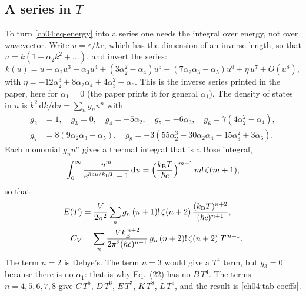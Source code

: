 \subsection{A series in \texorpdfstring{$T$}{T}}
To turn \eqref{ch04:eq-energy} into a series one needs the integral over energy, not over wavevector.
Write $u=\varepsilon/\hbar c$, which has the dimension of an inverse length, so that $u=k(1+\alpha_2k^2+\dots)$, and invert the series:
\begin{equation}\label{ch04:eq-inverse}
 k(u)=u-\alpha_2u^3-\alpha_3u^4+(3\alpha_2^2-\alpha_4)u^5+(7\alpha_2\alpha_3-\alpha_5)u^6+\eta\,u^7+O(u^8),
\end{equation}
with $\eta=-12\alpha_2^3+8\alpha_2\alpha_4+4\alpha_3^2-\alpha_6$.
This is the inverse series printed in the paper, here for $\alpha_1=0$ (the paper prints it for general $\alpha_1$).
The density of states in $u$ is $k^2\,\mathrm dk/\mathrm du=\sum_n g_n u^n$ with
\begin{equation}\label{ch04:eq-dos}
\begin{aligned}
 g_2&=1,\quad g_3=0,\quad g_4=-5\alpha_2,\quad g_5=-6\alpha_3,\quad g_6=7(4\alpha_2^2-\alpha_4),\\
 g_7&=8(9\alpha_2\alpha_3-\alpha_5),\quad g_8=-3(55\alpha_2^3-30\alpha_2\alpha_4-15\alpha_3^2+3\alpha_6).
\end{aligned}
\end{equation}
Each monomial $g_nu^n$ gives a thermal integral that is a Bose integral,
\begin{equation}\label{ch04:eq-bose}
 \int_0^\infty\frac{u^{m}}{e^{\hbar cu/k_{\mathrm B} T}-1}\,\mathrm du=\Bigl(\frac{k_{\mathrm B} T}{\hbar c}\Bigr)^{m+1}\,m!\,\zeta(m+1),
\end{equation}
so that
\begin{align}
 E(T)&=\frac{V}{2\pi^2}\sum_n g_n\,(n+1)!\,\zeta(n+2)\,\frac{(k_{\mathrm B} T)^{n+2}}{(\hbar c)^{n+1}},\label{ch04:eq-series-E}\\
 C_V&=\sum_n\frac{Vk_{\mathrm B}^{\,n+2}}{2\pi^2(\hbar c)^{n+1}}\,g_n\,(n+2)!\,\zeta(n+2)\;T^{\,n+1}.\label{ch04:eq-series}
\end{align}
The term $n=2$ is Debye's.
The term $n=3$ would give a $T^4$ term, but $g_3=0$ because there is no $\alpha_1$: that is why Eq.~(22) has no $B\,T^4$.
The terms $n=4,5,6,7,8$ give $C\,T^5$, $D\,T^6$, $E\,T^7$, $K\,T^8$, $L\,T^9$, and the result is \cref{ch04:tab-coeffs}.

